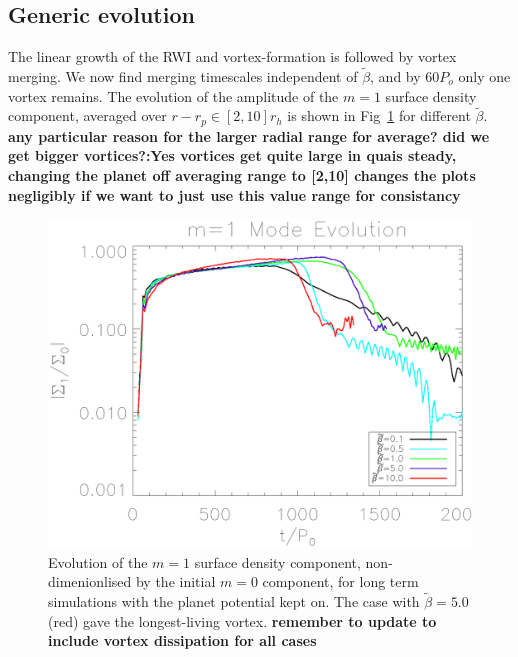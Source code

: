 \subsection{Generic evolution} 
The linear growth of the RWI and vortex-formation is followed by 
vortex merging. We now find merging timescales independent of
$\tilde\beta$, and by $60P_o$ only one vortex remains.  
The evolution of the amplitude of the $m=1$ surface density component,
averaged over $r-r_p\in[2,10]r_h$ is shown in Fig~\ref{lifetimeplot} 
for different $\tilde\beta$. 
{\bf any particular reason for the larger radial range for average?
  did we get bigger vortices?:Yes vortices get quite large in quais steady,
 changing the planet off averaging range to [2,10] changes the plots negligibly
 if we want to just use this value range for consistancy } 

\begin{figure}
  \includegraphics[width=\linewidth,clip=true,trim=0.5cm
  0cm 0cm 1cm]{figures/longterm_stability}
  \caption{Evolution of the $m=1$ surface density component,
    non-dimenionlised by the initial $m=0$ component, for long term
    simulations with the planet potential kept on. The case with 
    $\tilde\beta=5.0$ (red) gave the longest-living vortex. {\bf
      remember to update to 
      include vortex dissipation for all cases} \label{lifetimeplot}} 
\end{figure}

